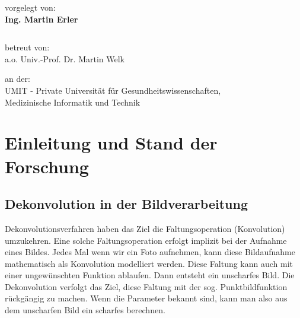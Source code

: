 \documentclass[a4paper,12pt]{article}
\begin{document}
\begin{verbatim}
\end{verbatim}



\begin{center}
vorgelegt von: \\
\textbf{\Large{Ing. Martin Erler}}
\end{center}


\begin{verbatim}
\end{verbatim}


\begin{center}
betreut von:\\
a.o. Univ.-Prof. Dr. Martin Welk
\end{center}

\begin{center}
an der:\\
UMIT - Private Universität für Gesundheitswissenschaften,\\
Medizinische Informatik und Technik
\end{center}



\newpage
\tableofcontents
\newpage

 


\section{Einleitung und Stand der Forschung}
\subsection{Dekonvolution in der Bildverarbeitung}



Dekonvolutionsverfahren haben das Ziel die Faltungsoperation (Konvolution)
umzukehren. Eine solche Faltungsoperation erfolgt implizit bei der Aufnahme
eines Bildes. Jedes Mal wenn wir ein Foto aufnehmen, kann
diese Bildaufnahme mathematisch als Konvolution modelliert werden. Diese Faltung
kann auch mit einer ungewünschten Funktion ablaufen. Dann entsteht ein
unscharfes Bild. Die Dekonvolution verfolgt das Ziel, diese Faltung mit der
sog. Punktbildfunktion rückgängig zu machen. Wenn die Parameter bekannt sind,
kann man also aus dem unscharfen Bild ein scharfes berechnen.
\end{document}

